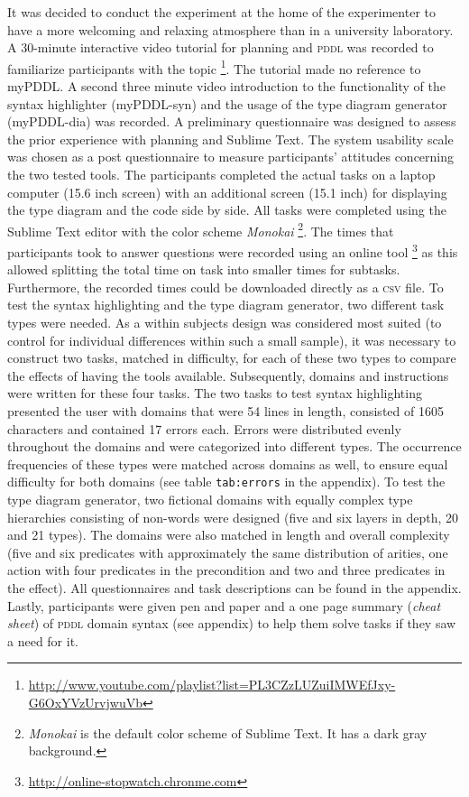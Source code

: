 \documentclass[a4paper,12pt]{report}
\newcommand{\mypddl}{\smallerft[0.8]{myPDDL}\xspace}
\newcommand{\pddl}{\textsc{pddl}\xspace}
\newcommand\smallerft[2][0.85]{{\scalefont{#1}#2}}
\begin{document}
It was decided to conduct the experiment at the home of the
experimenter to have a more welcoming and relaxing atmosphere than in
a university laboratory. A 30-minute interactive video tutorial for
planning and \pddl was recorded to familiarize participants with the
topic \footnote{\url{http://www.youtube.com/playlist?list=PL3CZzLUZuiIMWEfJxy-G6OxYVzUrvjwuVb}}. The tutorial made no reference to \mypddl. A second
three minute video introduction to the functionality of the syntax
highlighter (\mypddl-syn) and the usage of the type diagram generator
(\mypddl-dia) was recorded. A preliminary questionnaire was designed
to assess the prior experience with planning and Sublime Text. The
system usability scale \cite{brooke1996sus} was chosen as a post
questionnaire to measure participants’ attitudes concerning the two
tested tools. The participants completed the actual tasks on a laptop
computer (15.6 inch screen) with an additional screen (15.1 inch) for
displaying the type diagram and the code side by side. All tasks were
completed using the Sublime Text editor with the color scheme
\emph{Monokai} \footnote{\emph{Monokai} is the default color scheme of Sublime Text. It has
a dark gray background.}. The times that participants took to answer
questions were recorded using an online tool \footnote{\url{http://online-stopwatch.chronme.com}} as this allowed
splitting the total time on task into smaller times for subtasks.
Furthermore, the recorded times could be downloaded directly as a
\textsc{csv} file. To test the syntax highlighting and the type
diagram generator, two different task types were needed. As a within
subjects design was considered most suited (to control for individual
differences within such a small sample), it was necessary to construct
two tasks, matched in difficulty, for each of these two types to
compare the effects of having the tools available. Subsequently,
domains and instructions were written for these four tasks. The two
tasks to test syntax highlighting presented the user with domains that
were 54 lines in length, consisted of 1605 characters and contained 17
errors each. Errors were distributed evenly throughout the domains and
were categorized into different types. The occurrence frequencies of
these types were matched across domains as well, to ensure equal
difficulty for both domains (see table \texttt{tab:errors} in the appendix). To
test the type diagram generator, two fictional domains with equally
complex type hierarchies consisting of non-words were designed (five
and six layers in depth, 20 and 21 types). The domains were also
matched in length and overall complexity (five and six predicates with
approximately the same distribution of arities, one action with four
predicates in the precondition and two and three predicates in the
effect). All questionnaires and task descriptions can be found in the
appendix. Lastly, participants were given pen and paper and a one page
summary (\emph{cheat sheet}) of \pddl domain syntax (see appendix) to help
them solve tasks if they saw a need for it.
\end{document}
